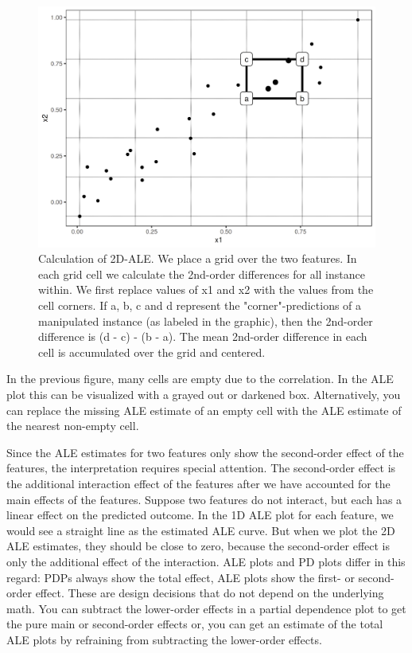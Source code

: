 \documentclass[12pt,]{krantz}
\begin{document}
\begin{figure}

{\centering \includegraphics[width=\textwidth]{images/aleplot-computation-2d-1} 

}

\caption{Calculation of 2D-ALE. We place a grid over the two features. In each grid cell we calculate the 2nd-order differences for all instance within. We first replace values of x1 and x2 with the values from the cell corners. If a, b, c and d represent the "corner"-predictions of a manipulated instance (as labeled in the graphic), then the 2nd-order difference is (d - c) - (b - a). The mean 2nd-order difference in each cell is accumulated over the grid and centered.}\label{fig:aleplot-computation-2d}
\end{figure}

In the previous figure, many cells are empty due to the correlation. In
the ALE plot this can be visualized with a grayed out or darkened box.
Alternatively, you can replace the missing ALE estimate of an empty cell
with the ALE estimate of the nearest non-empty cell.

Since the ALE estimates for two features only show the second-order
effect of the features, the interpretation requires special attention.
The second-order effect is the additional interaction effect of the
features after we have accounted for the main effects of the features.
Suppose two features do not interact, but each has a linear effect on
the predicted outcome. In the 1D ALE plot for each feature, we would see
a straight line as the estimated ALE curve. But when we plot the 2D ALE
estimates, they should be close to zero, because the second-order effect
is only the additional effect of the interaction. ALE plots and PD plots
differ in this regard: PDPs always show the total effect, ALE plots show
the first- or second-order effect. These are design decisions that do
not depend on the underlying math. You can subtract the lower-order
effects in a partial dependence plot to get the pure main or
second-order effects or, you can get an estimate of the total ALE plots
by refraining from subtracting the lower-order effects.
\end{document}
